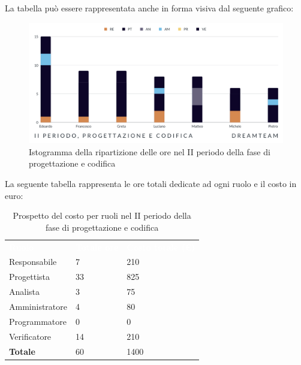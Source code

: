 La tabella può essere rappresentata anche in forma visiva dal seguente grafico:
\begin{figure}[H]
\centering
\includegraphics[scale=0.65]{Sezioni/SezioniPreventivo/grafici/Progettazione_codifica_II_periodo.png}
\caption{Istogramma della ripartizione delle ore nel II periodo della fase di progettazione e codifica}
\end{figure}

La seguente tabella rappresenta le ore totali dedicate ad ogni ruolo e il costo in euro:

\begin{table}[H]
\begin{center}
\renewcommand{\arraystretch}{1.5}
\begin{tabular}{ m{}<{\centering}  m{}<{\centering} m{}<{\centering}}
	\rowcolor{darkblue}
	\textcolor{white}{\textbf{Ruolo}}&\textcolor{white}{\textbf{Totale ore}}&\textcolor{white}{\textbf{Costo totale (\euro)}}\\ 

	Responsabile  & 7 & 210 \\	
	
	Progettista & 33 & 825 \\
	
	Analista & 3 & 75 \\

	Amministratore & 4 & 80 \\
	
	Programmatore & 0 & 0 \\
	
	Verificatore & 14 & 210 \\
	
	\textbf{Totale} & 60 & 1400 \\
	
\end{tabular}
\caption{Prospetto del costo per ruoli nel II periodo della fase di progettazione e codifica}
\end{center}
\end{table}

